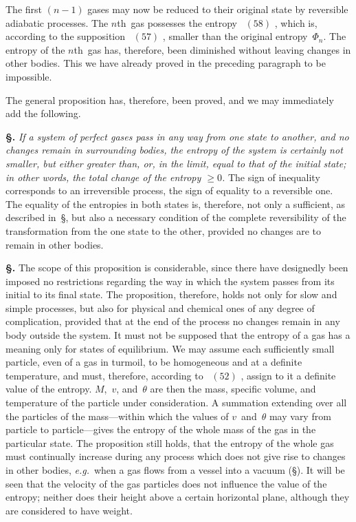 \documentclass[12pt]{book}[2005/09/16]
\newcommand{\Section}[1]{
  \medskip\par\textbf{§\;#1}
  \label{section:#1}
}
\newcommand{\SecRef}[2][§\;]{\hyperref[section:#2.]{{\upshape #1#2}}}
\newcommand{\Eq}[1]{%
  \hyperref[eqn:#1]{\ensuremath{#1}}%
}
\newcommand{\PageSep}[1]{\ignorespaces}
\newcommand{\eg}{\emph{e.g.}}
\begin{document}
The first $(n - 1)$ gases may now be reduced to their
original state by reversible adiabatic processes. The $n$th~gas
possesses the entropy~\Eq{(58)}, which is, according to the supposition~\Eq{(57)},
smaller than the original entropy~$\Phi_{n}$. The entropy
of the $n$th~gas has, therefore, been diminished without
leaving changes in other bodies. This we have already
proved in the preceding paragraph to be impossible.
\PageSep{94}

The general proposition has, therefore, been proved, and
we may immediately add the following.

\Section{126.} \emph{If a system of perfect gases pass in any way from
%
one state to another, and no changes remain in surrounding
bodies, the entropy of the system is certainly not smaller,
but either greater than, or, in the limit, equal to that of the
initial state; in other words, the total change of the entropy
$\geq 0$.} The sign of inequality corresponds to an irreversible
process, the sign of equality to a reversible one. The
equality of the entropies in both states is, therefore, not
only a sufficient, as described in~\SecRef{123}, but also a necessary
condition of the complete reversibility of the transformation
from the one state to the other, provided no changes are to
remain in other bodies.

\Section{127.} The scope of this proposition is considerable,
since there have designedly been imposed no restrictions
regarding the way in which the system passes from its
initial to its final state. The proposition, therefore, holds
not only for slow and simple processes, but also for physical
and chemical ones of any degree of complication, provided
that at the end of the process no changes remain in any
body outside the system. It must not be supposed that
the entropy of a gas has a meaning only for states of
equilibrium. We may assume each sufficiently small
particle, even of a gas in turmoil, to be homogeneous and
at a definite temperature, and must, therefore, according to~\Eq{(52)},
assign to it a definite value of the entropy. $M$,~$v$,
and~$\theta$ are then the mass, specific volume, and temperature
of the particle under consideration. A summation extending
over all the particles of the mass---within which the values
of $v$~and~$\theta$ may vary from particle to particle---gives the
entropy of the whole mass of the gas in the particular state.
The proposition still holds, that the entropy of the whole
gas must continually increase during any process which
does not give rise to changes in other bodies, \eg\ when a
gas flows from a vessel into a vacuum (\SecRef{68}). It will be
seen that the velocity of the gas particles does not influence
\PageSep{95}
the value of the entropy; neither does their height above
a certain horizontal plane, although they are considered to
have weight.
\end{document}
